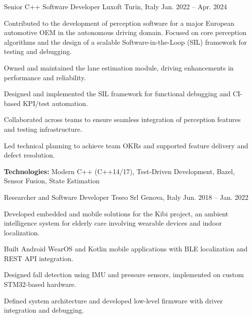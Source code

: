 
\begin{cventries}

  \cventry
    {Senior C++ Software Developer} %
    {Luxoft} %
    {Turin, Italy} %
    {Jan. 2022 -- Apr. 2024} %
    {
      \begin{cvparagraph}
        Contributed to the development of perception software for a major European automotive OEM in the autonomous driving domain. Focused on core perception algorithms and the design of a scalable Software-in-the-Loop (SIL) framework for testing and debugging.
      \end{cvparagraph}
      \vspace{1em}
      \begin{cvitems}
        \item {Owned and maintained the lane estimation module, driving enhancements in performance and reliability.}
        \item {Designed and implemented the SIL framework for functional debugging and CI-based KPI/test automation.}
        \item {Collaborated across teams to ensure seamless integration of perception features and testing infrastructure.}
        \item {Led technical planning to achieve team OKRs and supported feature delivery and defect resolution.}
        \item {\textbf{Technologies:} Modern C++ (C++14/17), Test-Driven Development, Bazel, Sensor Fusion, State Estimation}
      \end{cvitems}
    }

  \cventry
    {Researcher and Software Developer} %
    {Teseo Srl} %
    {Genova, Italy} %
    {Jun. 2018 -- Jan. 2022} %
    {
      \begin{cvparagraph}
        Developed embedded and mobile solutions for the Kibi project, an ambient intelligence system for elderly care involving wearable devices and indoor localization.
      \end{cvparagraph}
      \vspace{1em}
      \begin{cvitems}
        \item {Built Android WearOS and Kotlin mobile applications with BLE localization and REST API integration.}
        \item {Designed fall detection using IMU and pressure sensors, implemented on custom STM32-based hardware.}
        \item {Defined system architecture and developed low-level firmware with driver integration and debugging.}
      \end{cvitems}
    }


\end{cventries}
